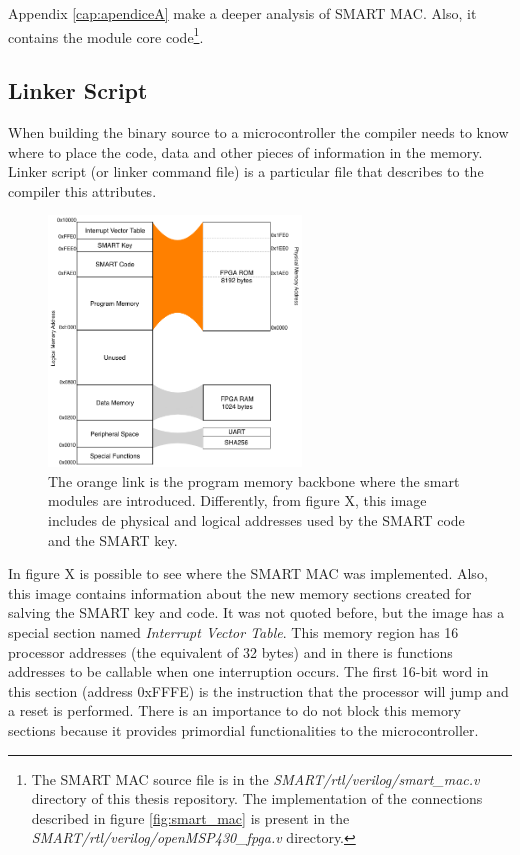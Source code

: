 Appendix \ref{cap:apendiceA} make a deeper analysis of SMART MAC. Also, it contains the module core code\footnote{The SMART MAC source file is in the \mbox{\textit{SMART/rtl/verilog/smart\_mac.v}} directory of this thesis repository. The implementation of the connections described in figure \ref{fig:smart_mac} is present in the \mbox{\textit{SMART/rtl/verilog/openMSP430\_fpga.v}} directory. }.

\subsection{Linker Script}

When building the binary source to a microcontroller the compiler needs to know where to place the code, data and other pieces of information in the memory. Linker script (or linker command file) is a particular file that describes to the compiler this attributes.


\begin{figure}[h]
	\centering
	\includegraphics[width=0.6\textwidth]{figuras/smart_bus}
	\caption{The orange link is the program memory backbone where the smart modules are introduced. Differently, from figure X, this image includes de physical and logical addresses used by the SMART code and the SMART key. }
	\label{fig:smart_bus}
\end{figure}

In figure X is possible to see where the SMART MAC was implemented. Also, this image contains information about the new memory sections created for salving the SMART key and code. It was not quoted before, but the image has a special section named \textit{Interrupt Vector Table}. This memory region has 16 processor addresses (the equivalent of 32 bytes) and in there is functions addresses to be callable when one interruption occurs.  The first 16-bit word in this section (address 0xFFFE) is the instruction that the processor will jump and a reset is performed.   There is an importance to do not block this memory sections because it provides primordial functionalities to the microcontroller. 


